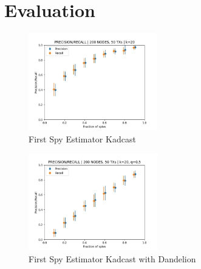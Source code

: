 \section{Evaluation\label{evaluation}}

\begin{figure}
  \centering
      \includegraphics[width=0.5\textwidth]{figs/nodand}
  \caption{First Spy Estimator Kadcast}
  \label{fig:nodand}
\end{figure}

\begin{figure}
  \centering
      \includegraphics[width=0.5\textwidth]{figs/dand05}
  \caption{First Spy Estimator Kadcast with Dandelion}
  \label{fig:dand}
\end{figure}

